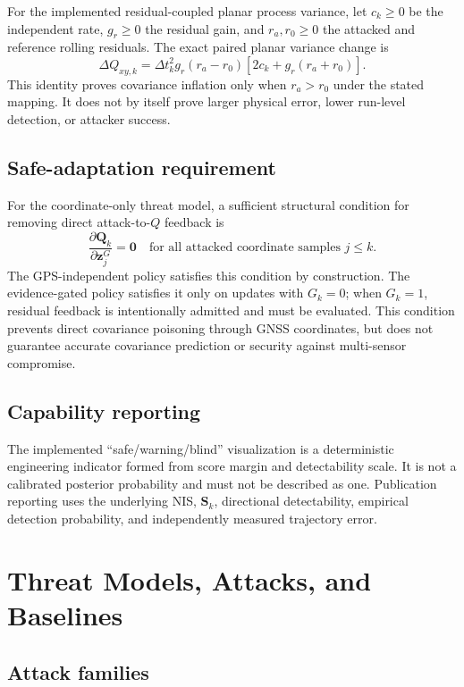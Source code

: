 \documentclass[11pt,a4paper]{article}
\begin{document}
For the implemented residual-coupled planar process variance, let
$c_k\ge0$ be the independent rate, $g_r\ge0$ the residual gain, and
$r_a,r_0\ge0$ the attacked and reference rolling residuals. The exact paired
planar variance change is
\[
\Delta Q_{xy,k}
=\Delta t_k^2 g_r(r_a-r_0)
\left[2c_k+g_r(r_a+r_0)\right].
\]
This identity proves covariance inflation only when $r_a>r_0$ under the stated
mapping. It does not by itself prove larger physical error, lower run-level
detection, or attacker success.

\subsection{Safe-adaptation requirement}

For the coordinate-only threat model, a sufficient structural condition for
removing direct attack-to-$Q$ feedback is
\[
\frac{\partial\mathbf Q_k}{\partial\mathbf z_j^{G}}=\mathbf0
\quad\text{for all attacked coordinate samples }j\le k.
\]
The GPS-independent policy satisfies this condition by construction. The
evidence-gated policy satisfies it only on updates with $G_k=0$; when $G_k=1$,
residual feedback is intentionally admitted and must be evaluated. This
condition prevents direct covariance poisoning through GNSS coordinates, but
does not guarantee accurate covariance prediction or security against
multi-sensor compromise.

\subsection{Capability reporting}

The implemented ``safe/warning/blind'' visualization is a deterministic
engineering indicator formed from score margin and detectability scale. It is
not a calibrated posterior probability and must not be described as one.
Publication reporting uses the underlying NIS, $\mathbf S_k$, directional
detectability, empirical detection probability, and independently measured
trajectory error.

\section{Threat Models, Attacks, and Baselines}

\subsection{Attack families}
\end{document}
